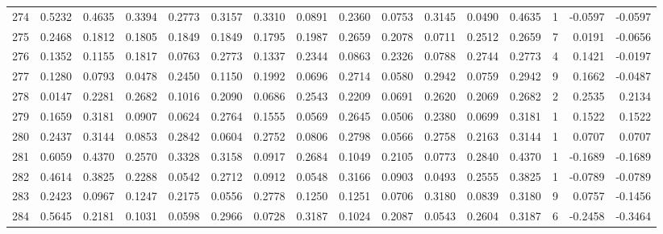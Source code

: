 \begin{tabular}{lrrrrrrrrrrrrrrr}
274 &      0.5232 &  0.4635 &  0.3394 &  0.2773 &  0.3157 &  0.3310 &  0.0891 &  0.2360 &  0.0753 &  0.3145 &   0.0490 &     0.4635 &      1 &                   -0.0597 &                    -0.0597 \\
275 &      0.2468 &  0.1812 &  0.1805 &  0.1849 &  0.1849 &  0.1795 &  0.1987 &  0.2659 &  0.2078 &  0.0711 &   0.2512 &     0.2659 &      7 &                    0.0191 &                    -0.0656 \\
276 &      0.1352 &  0.1155 &  0.1817 &  0.0763 &  0.2773 &  0.1337 &  0.2344 &  0.0863 &  0.2326 &  0.0788 &   0.2744 &     0.2773 &      4 &                    0.1421 &                    -0.0197 \\
277 &      0.1280 &  0.0793 &  0.0478 &  0.2450 &  0.1150 &  0.1992 &  0.0696 &  0.2714 &  0.0580 &  0.2942 &   0.0759 &     0.2942 &      9 &                    0.1662 &                    -0.0487 \\
278 &      0.0147 &  0.2281 &  0.2682 &  0.1016 &  0.2090 &  0.0686 &  0.2543 &  0.2209 &  0.0691 &  0.2620 &   0.2069 &     0.2682 &      2 &                    0.2535 &                     0.2134 \\
279 &      0.1659 &  0.3181 &  0.0907 &  0.0624 &  0.2764 &  0.1555 &  0.0569 &  0.2645 &  0.0506 &  0.2380 &   0.0699 &     0.3181 &      1 &                    0.1522 &                     0.1522 \\
280 &      0.2437 &  0.3144 &  0.0853 &  0.2842 &  0.0604 &  0.2752 &  0.0806 &  0.2798 &  0.0566 &  0.2758 &   0.2163 &     0.3144 &      1 &                    0.0707 &                     0.0707 \\
281 &      0.6059 &  0.4370 &  0.2570 &  0.3328 &  0.3158 &  0.0917 &  0.2684 &  0.1049 &  0.2105 &  0.0773 &   0.2840 &     0.4370 &      1 &                   -0.1689 &                    -0.1689 \\
282 &      0.4614 &  0.3825 &  0.2288 &  0.0542 &  0.2712 &  0.0912 &  0.0548 &  0.3166 &  0.0903 &  0.0493 &   0.2555 &     0.3825 &      1 &                   -0.0789 &                    -0.0789 \\
283 &      0.2423 &  0.0967 &  0.1247 &  0.2175 &  0.0556 &  0.2778 &  0.1250 &  0.1251 &  0.0706 &  0.3180 &   0.0839 &     0.3180 &      9 &                    0.0757 &                    -0.1456 \\
284 &      0.5645 &  0.2181 &  0.1031 &  0.0598 &  0.2966 &  0.0728 &  0.3187 &  0.1024 &  0.2087 &  0.0543 &   0.2604 &     0.3187 &      6 &                   -0.2458 &                    -0.3464 \\

\end{tabular}
